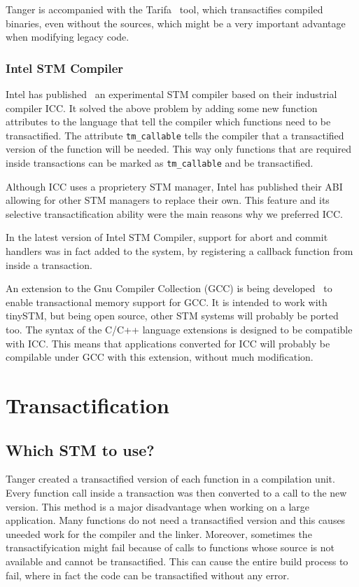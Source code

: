 \documentclass[preprint,natbib,11pt]{sigplanconf}
\begin{document}
{\sc Tanger} is accompanied with the {\sc Tarifa}~\cite{felber2007tanger}
tool, which transactifies compiled binaries, even without the sources, which
might be a very important advantage when modifying legacy code.

\subsubsection{Intel STM Compiler}
Intel has published~\cite{icc} an experimental STM compiler based on their industrial
compiler ICC. It solved the above problem by adding some new function attributes
to the language that tell the compiler which functions need to be transactified.
The attribute {\tt tm\_callable} tells the compiler that a transactified version
of the function will be needed. This way only functions that are required inside
transactions can be marked as {\tt tm\_callable} and be transactified.

Although ICC uses a proprietery STM manager, Intel has published their
ABI~\cite{icc:abi} allowing for other STM managers to replace their own. This feature
and its selective transactification ability were the main reasons why we
preferred ICC.

In the latest version of Intel STM Compiler, support for abort and commit
handlers was in fact added to the system, by registering a callback function
from inside a transaction.

An extension to the Gnu Compiler Collection (GCC) is being developed~\cite{gcctm} to
enable transactional memory support for GCC. It is intended to work with
tinySTM, but being open source, other STM systems will probably be ported too.
The syntax of the C/C++ language extensions is designed to be compatible with
ICC. This means that applications converted for ICC will probably be compilable
under GCC with this extension, without much modification.

\section{Transactification}\label{sec:transactification}
\subsection{Which STM to use?}
{\sc Tanger} created a transactified version of each function in a compilation
unit.  Every function call inside a transaction was then converted to a call to
the new version. This method is a major disadvantage when working on a large
application. Many functions do not need a transactified version and this causes
uneeded work for the compiler and the linker. Moreover, sometimes the
transactifyication might fail because of calls to functions whose source is not
available and cannot be transactified. This can cause the entire build process
to fail, where in fact the code can be transactified without any error.
\end{document}
